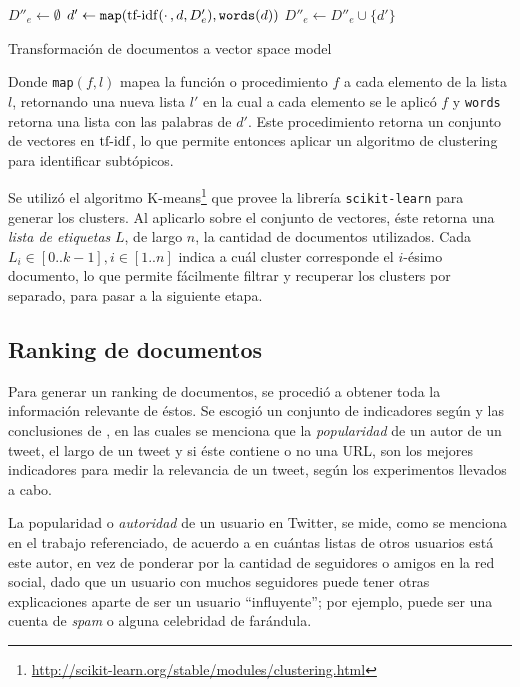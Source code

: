 \begin{algorithm}[H]
$D''_e \leftarrow \emptyset$ \;
 {
   $d' \leftarrow \texttt{map}(\operatorname{tf-idf}(\cdotp, d, D'_e), \texttt{words}(d))$\;
}
$D''_e \leftarrow D''_e \cup \{d'\}$\;
\caption{Transformación de documentos a vector space model}
\end{algorithm}

    Donde \texttt{map}$(f,l)$ mapea la
    función o procedimiento $f$ a cada elemento de la lista $l$,
    retornando una nueva lista $l'$ en la cual a cada elemento se le
    aplicó $f$ y \texttt{words} retorna una lista con las palabras de
    $d'$. Este procedimiento retorna un conjunto de vectores en
    $\operatorname{tf-idf}$, lo que permite entonces aplicar un algoritmo de
    clustering para identificar subtópicos.

    Se utilizó el algoritmo
    K-means\footnote{\href{http://scikit-learn.org/stable/modules/clustering.html}{http://scikit-learn.org/stable/modules/clustering.html} }
    que provee la librería
    \texttt{scikit-learn} para generar los clusters. Al
    aplicarlo sobre el conjunto de vectores, éste retorna una
    \emph{lista de etiquetas} $L$, de largo $n$, la cantidad de documentos
    utilizados. Cada $L_i \in [0..k-1], i \in [1..n]$ indica a cuál
    cluster corresponde el $i$-ésimo documento, lo que permite
    fácilmente filtrar y recuperar los clusters por separado, para
    pasar a la siguiente etapa.


\subsection{Ranking de documentos}
\label{sec-4.2.3}


    Para generar un ranking de documentos, se procedió a obtener toda
    la información relevante de éstos. Se escogió un conjunto de
    indicadores según \cite{Castillo:2011:ICT:1963405.1963500} y las
    conclusiones de \cite{Duan:2010:ESL:1873781.1873815}, en
    las cuales se menciona
    que la \emph{popularidad} de un autor de un tweet, el largo de un tweet
    y si éste contiene o no una URL, son los mejores indicadores para
    medir la relevancia de un tweet, según los experimentos llevados a
    cabo.

    La popularidad o \emph{autoridad} de un usuario en Twitter, se mide,
    como se menciona en el trabajo referenciado, de acuerdo a en
    cuántas listas de otros usuarios está este autor, en vez de
    ponderar por la cantidad de seguidores o amigos en la red social,
    dado que un usuario con muchos seguidores puede tener otras
    explicaciones aparte de ser un usuario ``influyente''; por ejemplo,
    puede ser una cuenta de \emph{spam} o alguna celebridad de farándula.

